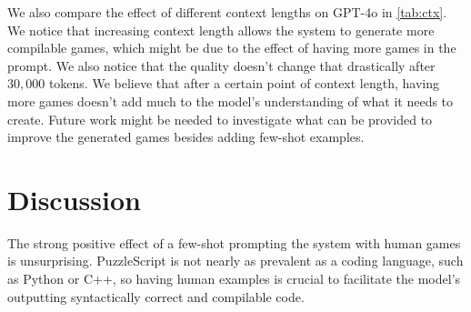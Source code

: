 \documentclass[conference]{IEEEtran}
\begin{document}
We also compare the effect of different context lengths on GPT-4o in \autoref{tab:ctx}. We notice that increasing context length allows the system to generate more compilable games, which might be due to the effect of having more games in the prompt. We also notice that the quality doesn't change that drastically after $30,000$ tokens. We believe that after a certain point of context length, having more games doesn't add much to the model's understanding of what it needs to create. Future work might be needed to investigate what can be provided to improve the generated games besides adding few-shot examples.

\begin{table}
\begin{center}
\caption{Effect of increasing GPT-4o's context window when including human-authored games in the prompt.}

\label{tab:ctx}
\end{center}
\end{table}




\section{Discussion}

The strong positive effect of a few-shot prompting the system with human games is unsurprising. PuzzleScript is not nearly as prevalent as a coding language, such as Python or C++, so having human examples is crucial to facilitate the model's outputting syntactically correct and compilable code.
\end{document}
